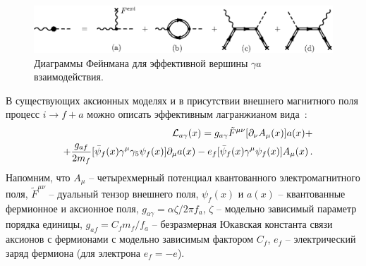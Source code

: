 \begin{figure}
\centerline{\includegraphics[width=15cm]{fig5_2.eps}}
\caption{ Диаграммы Фейнмана для эффективной вершины $\gamma a$ 
взаимодействия.}
\label{fig:vertexaxion}
\end{figure}



 В существующих аксионных моделях и в присутствии 
внешнего магнитного поля процесс  $i \to f+a$ 
можно описать эффективным лагранжианом вида~\cite{Raffelt:1996}:
%
\begin{eqnarray}
\label{eq:L1}
&&{\cal L}_{a\gamma}(x) = g_{a\gamma}\tilde F^{\mu \nu} [\partial_{\nu}A_{\mu}(x)] a(x) + 
\\
\nonumber
&& + \frac{g_{af}}{2m_f} 
[\bar \psi_f(x) \gamma^{\mu} \gamma_5 \psi_f(x)] \partial_{\mu} a(x) - 
 e_f[\bar \psi_f(x) \gamma^{\mu} \psi_f(x)]A_{\mu}(x) \, .
\end{eqnarray}
%
\noindent Напомним, что  $A_{\mu}$ -- четырехмерный потенциал квантованного электромагнитного
поля, $\tilde F^{\mu \nu}$ --  дуальный тензор внешнего поля,  $\psi_f(x)$  и $a(x)$ --  
квантованные фермионное и аксионное поля, 
  $g_{a\gamma} = \alpha \zeta/2\pi f_a$, $\zeta$ --  модельно зависимый 
параметр порядка единицы, 
$g_{af} = C_f m_f/f_a$ -- безразмерная Юкавская константа связи аксионов с 
фермионами с модельно зависимым фактором $C_f$, $e_f$ -- электрический заряд 
фермиона (для электрона $e_f = - e$). 

